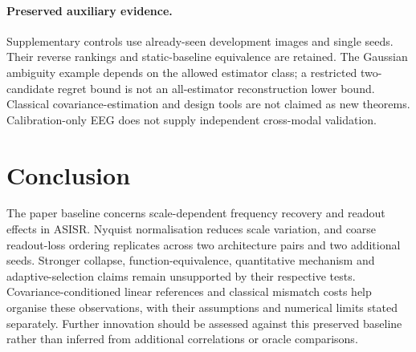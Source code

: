 \paragraph{Preserved auxiliary evidence.} Supplementary controls use already-seen development images and single seeds. Their reverse rankings and static-baseline equivalence are retained. The Gaussian ambiguity example depends on the allowed estimator class; a restricted two-candidate regret bound is not an all-estimator reconstruction lower bound. Classical covariance-estimation and design tools are not claimed as new theorems. Calibration-only EEG does not supply independent cross-modal validation.

\section{Conclusion}
The paper baseline concerns scale-dependent frequency recovery and readout effects in ASISR. Nyquist normalisation reduces scale variation, and coarse readout-loss ordering replicates across two architecture pairs and two additional seeds. Stronger collapse, function-equivalence, quantitative mechanism and adaptive-selection claims remain unsupported by their respective tests. Covariance-conditioned linear references and classical mismatch costs help organise these observations, with their assumptions and numerical limits stated separately. Further innovation should be assessed against this preserved baseline rather than inferred from additional correlations or oracle comparisons.
